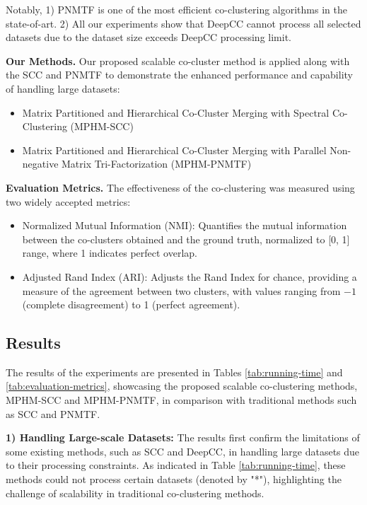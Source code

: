 \documentclass[journal]{IEEEtran}
\begin{document}
Notably, 1) PNMTF is one of the most efficient co-clustering algorithms in the state-of-art. 2) All our experiments show that DeepCC cannot process all selected datasets due to the dataset size exceeds DeepCC processing limit.

\textbf{Our Methods.} Our proposed scalable co-cluster method is applied along with the SCC and PNMTF to demonstrate the enhanced performance and capability of handling large datasets:
\begin{itemize}
  \item Matrix Partitioned and Hierarchical Co-Cluster Merging with Spectral Co-Clustering (MPHM-SCC)
  \item Matrix Partitioned and Hierarchical Co-Cluster Merging with Parallel Non-negative Matrix Tri-Factorization (MPHM-PNMTF)
\end{itemize}

\textbf{Evaluation Metrics.}
The effectiveness of the co-clustering was measured using two widely accepted metrics:

\begin{itemize}
  \item Normalized Mutual Information (NMI): Quantifies the mutual information between the co-clusters obtained and the ground truth, normalized to [0, 1] range, where 1 indicates perfect overlap.
  \item Adjusted Rand Index (ARI): Adjusts the Rand Index for chance, providing a measure of the agreement between two clusters, with values ranging from $-1$ (complete disagreement) to 1 (perfect agreement).
\end{itemize}

\subsection{Results}
The results of the experiments are presented in Tables \ref{tab:running-time} and \ref{tab:evaluation-metrics}, showcasing the proposed scalable co-clustering methods, MPHM-SCC and MPHM-PNMTF, in comparison with traditional methods such as SCC and PNMTF.

\textbf{1) Handling Large-scale Datasets:} The results first confirm the limitations of some existing methods, such as SCC and DeepCC, in handling large datasets due to their processing constraints. As indicated in Table \ref{tab:running-time}, these methods could not process certain datasets (denoted by "*"), highlighting the challenge of scalability in traditional co-clustering methods.
\end{document}
